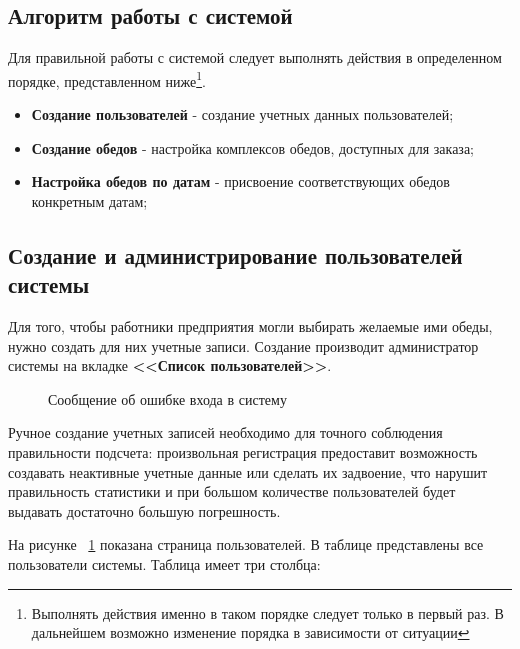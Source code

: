 \documentclass[a4paper]{article}
\begin{document}
\subsection{Алгоритм работы с системой}

Для правильной работы с системой следует выполнять действия в определенном порядке, представленном ниже\footnote{Выполнять действия именно в таком порядке следует только в первый раз. В дальнейшем возможно изменение порядка в зависимости от ситуации}.

\begin{itemize}
\setlength{\itemsep}{-2mm}
	\item \textbf{Создание пользователей} - создание учетных данных пользователей;
	\item \textbf{Создание обедов} - настройка комплексов обедов, доступных для заказа;
	\item \textbf{Настройка обедов по датам} -  присвоение соответствующих обедов конкретным датам;
\end{itemize}

\subsection{Создание и администрирование пользователей системы}

Для того, чтобы работники предприятия могли выбирать желаемые ими обеды, нужно создать для них учетные записи. Создание производит администратор системы на вкладке \textbf{<<Список пользователей>>}.

\begin{figure}[h]
\caption{Сообщение об ошибке входа в систему}
\label{fig:image8}
\end{figure}

Ручное создание учетных записей необходимо для точного соблюдения правильности подсчета: произвольная регистрация предоставит возможность создавать неактивные учетные данные или сделать их задвоение, что нарушит правильность статистики и при большом количестве пользователей будет выдавать достаточно большую погрешность.

На рисунке ~\ref{fig:image8} показана страница пользователей. В таблице представлены все пользователи системы. Таблица имеет три столбца:
\end{document}
